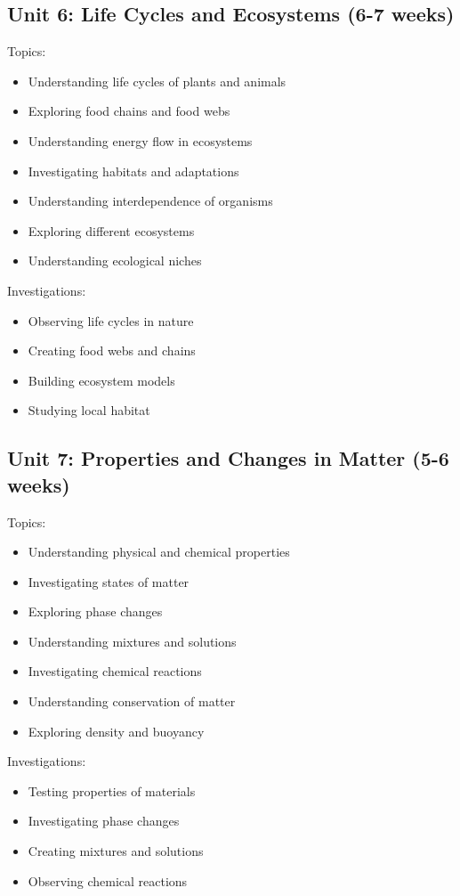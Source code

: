 \documentclass[11pt,letterpaper]{report}
\begin{document}
\subsection{Unit 6: Life Cycles and Ecosystems (6-7 weeks)}

Topics:
\begin{itemize}
\item Understanding life cycles of plants and animals
\item Exploring food chains and food webs
\item Understanding energy flow in ecosystems
\item Investigating habitats and adaptations
\item Understanding interdependence of organisms
\item Exploring different ecosystems
\item Understanding ecological niches
\end{itemize}

Investigations:
\begin{itemize}
\item Observing life cycles in nature
\item Creating food webs and chains
\item Building ecosystem models
\item Studying local habitat
\end{itemize}

\subsection{Unit 7: Properties and Changes in Matter (5-6 weeks)}

Topics:
\begin{itemize}
\item Understanding physical and chemical properties
\item Investigating states of matter
\item Exploring phase changes
\item Understanding mixtures and solutions
\item Investigating chemical reactions
\item Understanding conservation of matter
\item Exploring density and buoyancy
\end{itemize}

Investigations:
\begin{itemize}
\item Testing properties of materials
\item Investigating phase changes
\item Creating mixtures and solutions
\item Observing chemical reactions
\end{itemize}
\end{document}
